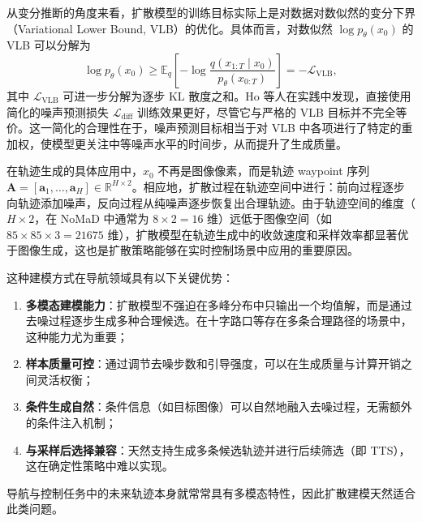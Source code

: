 从变分推断的角度来看，扩散模型的训练目标实际上是对数据对数似然的变分下界（Variational Lower Bound, VLB）的优化。具体而言，对数似然 $\log p_\theta(x_0)$ 的 VLB 可以分解为
\begin{equation}
\log p_\theta(x_0) \geq \mathbb{E}_q\!\left[-\log \frac{q(x_{1:T}\mid x_0)}{p_\theta(x_{0:T})}\right] = -\mathcal{L}_{\text{VLB}},
\end{equation}
其中 $\mathcal{L}_{\text{VLB}}$ 可进一步分解为逐步 KL 散度之和。Ho 等人\cite{ddpm2020}在实践中发现，直接使用简化的噪声预测损失 $\mathcal{L}_{\text{diff}}$ 训练效果更好，尽管它与严格的 VLB 目标并不完全等价。这一简化的合理性在于，噪声预测目标相当于对 VLB 中各项进行了特定的重加权，使模型更关注中等噪声水平的时间步，从而提升了生成质量。

在轨迹生成的具体应用中，$x_0$ 不再是图像像素，而是轨迹 waypoint 序列 $\mathbf{A} = [\mathbf{a}_1, \ldots, \mathbf{a}_H] \in \mathbb{R}^{H \times 2}$。相应地，扩散过程在轨迹空间中进行：前向过程逐步向轨迹添加噪声，反向过程从纯噪声逐步恢复出合理轨迹。由于轨迹空间的维度（$H \times 2$，在 NoMaD 中通常为 $8 \times 2 = 16$ 维）远低于图像空间（如 $85 \times 85 \times 3 = 21675$ 维），扩散模型在轨迹生成中的收敛速度和采样效率都显著优于图像生成，这也是扩散策略能够在实时控制场景中应用的重要原因。

这种建模方式在导航领域具有以下关键优势：
\begin{enumerate}
    \item \textbf{多模态建模能力}：扩散模型不强迫在多峰分布中只输出一个均值解，而是通过去噪过程逐步生成多种合理候选。在十字路口等存在多条合理路径的场景中，这种能力尤为重要；
    \item \textbf{样本质量可控}：通过调节去噪步数和引导强度，可以在生成质量与计算开销之间灵活权衡；
    \item \textbf{条件生成自然}：条件信息（如目标图像）可以自然地融入去噪过程，无需额外的条件注入机制；
    \item \textbf{与采样后选择兼容}：天然支持生成多条候选轨迹并进行后续筛选（即 TTS），这在确定性策略中难以实现。
\end{enumerate}
导航与控制任务中的未来轨迹本身就常常具有多模态特性，因此扩散建模天然适合此类问题。

